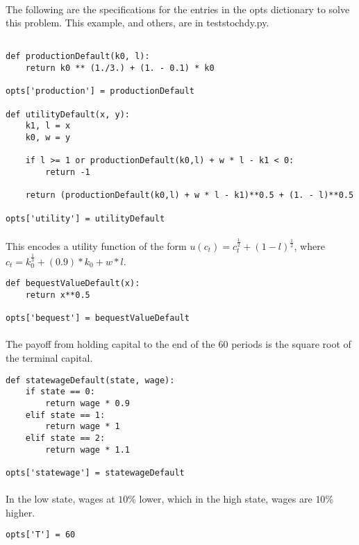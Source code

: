 \documentclass[11pt]{article}
\begin{document}
\paragraph{} The following are the specifications for the entries in the opts dictionary to solve this problem. This example, and others, are in teststochdy.py.

\begin{verbatim}

def productionDefault(k0, l):
    return k0 ** (1./3.) + (1. - 0.1) * k0 
	
opts['production'] = productionDefault

def utilityDefault(x, y):
    k1, l = x
    k0, w = y

    if l >= 1 or productionDefault(k0,l) + w * l - k1 < 0:
        return -1

    return (productionDefault(k0,l) + w * l - k1)**0.5 + (1. - l)**0.5
	
opts['utility'] = utilityDefault
\end{verbatim}
\paragraph{} This encodes a utility function of the form $u(c_t) = c_t^{\frac{1}{2}} + (1 - l)^{\frac{1}{2}}$, where $c_t = k_0^{\frac{1}{3}} + (0.9)*k_0 + w * l$.
\begin{verbatim}
def bequestValueDefault(x):
    return x**0.5
	
opts['bequest'] = bequestValueDefault
\end{verbatim}
\paragraph{} The payoff from holding capital to the end of the 60 periods is the square root of the terminal capital. 
\begin{verbatim}
def statewageDefault(state, wage):
    if state == 0:
        return wage * 0.9
    elif state == 1:
        return wage * 1
    elif state == 2:
        return wage * 1.1

opts['statewage'] = statewageDefault
\end{verbatim}
\paragraph{} In the low state, wages at $10\%$ lower, which in the high state, wages are $10\%$ higher.
\begin{verbatim}
opts['T'] = 60
\end{verbatim}
\end{document}
